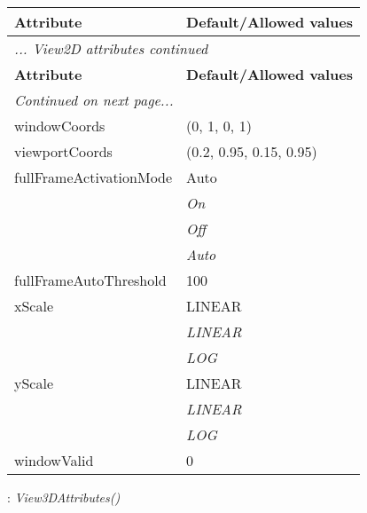 \documentclass[10pt,a4paper]{report}
\begin{document}
\begin{longtable}{ll}
{\bf Attribute} & {\bf Default/Allowed values} \\
\hline \hline
\endfirsthead
\multicolumn{2}{l}{{\it ... View2D attributes continued}} \\
{\bf Attribute} & {\bf Default/Allowed values} \\
\hline \hline
\endhead
\hline
\multicolumn{2}{l}{{\it Continued on next page...}} \\
\endfoot
\hline
\endlastfoot

windowCoords  &  (0, 1, 0, 1) \\
viewportCoords  &  (0.2, 0.95, 0.15, 0.95) \\
fullFrameActivationMode  &  Auto   \\
 & {\it  On} \\
 & {\it  Off} \\
 & {\it  Auto} \\
fullFrameAutoThreshold  &  100 \\
xScale  &  LINEAR   \\
 & {\it  LINEAR} \\
 & {\it  LOG} \\
yScale  &  LINEAR   \\
 & {\it  LINEAR} \\
 & {\it  LOG} \\
windowValid  &  0 \\
\end{longtable}

\newpage

{}
: {\it View3DAttributes() }\\[-3mm]
\end{document}
